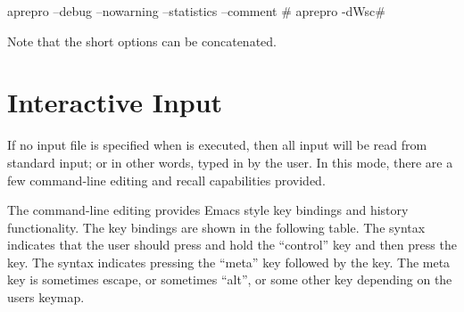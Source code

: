 \begin{apinp}
aprepro --debug --nowarning --statistics --comment \#
aprepro -dWsc\#
\end{apinp}
Note that the short options can be concatenated.

\section{Interactive Input}

If no input file is specified when \aprepro{} is executed, then all
input will be read from standard input; or in other words, typed in by
the user.  In this mode, there are a few command-line editing and
recall capabilities provided.

The command-line editing provides Emacs style key bindings and
history functionality.  The key bindings are shown in the following
table. The syntax  indicates that the user should press and
hold the ``control'' key and then press the  key. The syntax
 indicates pressing the ``meta'' key followed by the 
key. The meta key is sometimes escape, or sometimes ``alt'', or some
other key depending on the users keymap.

